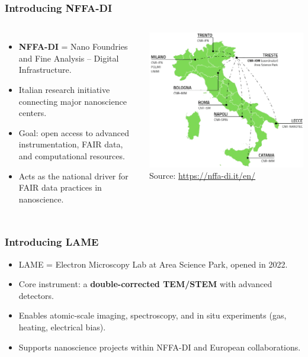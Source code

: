 \documentclass{beamer}
\begin{document}
	\begin{frame}
		\frametitle{Introducing NFFA-DI}
		\begin{columns}[T,totalwidth=\textwidth]
			\begin{itemize}
				\item \textbf{NFFA-DI} = Nano Foundries and Fine Analysis – Digital Infrastructure.
				\item Italian research initiative connecting major nanoscience centers.
				\item Goal: open access to advanced instrumentation, FAIR data, and computational resources.
				\item Acts as the national driver for FAIR data practices in nanoscience.
			\end{itemize}
			\includegraphics[width=\textwidth]{otherResources/NFFA_map.png} %
			\vspace{2em}
			\tiny Source: \url{https://nffa-di.it/en/}
		\end{columns}
	\end{frame}
	
	\begin{frame}
		\frametitle{Introducing LAME}
		
		\begin{itemize}
			\item LAME = Electron Microscopy Lab at Area Science Park, opened in 2022.
			\item Core instrument: a \textbf{double-corrected TEM/STEM} with advanced detectors.
			\item Enables atomic-scale imaging, spectroscopy, and in situ experiments 
			(gas, heating, electrical bias).
			\item Supports nanoscience projects within NFFA-DI and European collaborations.
		\end{itemize}
	\end{frame}
	
\end{document}
